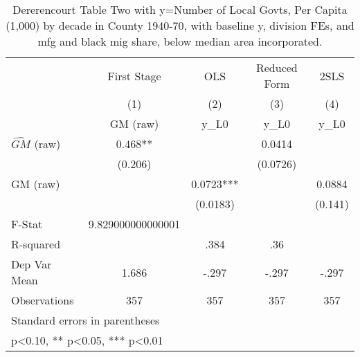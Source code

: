 \begin{table}[htbp]\centering
\def\sym#1{\ifmmode^{#1}\else\(^{#1}\)\fi}
\caption{Dererencourt Table Two with y=Number of Local Govts, Per Capita (1,000) by decade in County 1940-70, with baseline y, division FEs, and mfg and black mig share, below median area incorporated.}
\begin{tabular}{l*{4}{c}}
\toprule
                    & First Stage   &         OLS   &Reduced Form   &        2SLS   \\
                    &\multicolumn{1}{c}{(1)}&\multicolumn{1}{c}{(2)}&\multicolumn{1}{c}{(3)}&\multicolumn{1}{c}{(4)}\\
                    &\multicolumn{1}{c}{GM  (raw)}&\multicolumn{1}{c}{y\_L0}&\multicolumn{1}{c}{y\_L0}&\multicolumn{1}{c}{y\_L0}\\
\midrule
$\hat{GM}$ (raw)    &       0.468** &               &      0.0414   &               \\
                    &     (0.206)   &               &    (0.0726)   &               \\
\addlinespace
GM  (raw)           &               &      0.0723***&               &      0.0884   \\
                    &               &    (0.0183)   &               &     (0.141)   \\
\midrule
F-Stat              &9.829000000000001   &               &               &               \\
R-squared           &               &        .384   &         .36   &               \\
Dep Var Mean        &       1.686   &       -.297   &       -.297   &       -.297   \\
Observations        &         357   &         357   &         357   &         357   \\
\bottomrule
\multicolumn{5}{l}{\footnotesize Standard errors in parentheses}\\
\multicolumn{5}{l}{\footnotesize * p<0.10, ** p<0.05, *** p<0.01}\\
\end{tabular}
\end{table}
